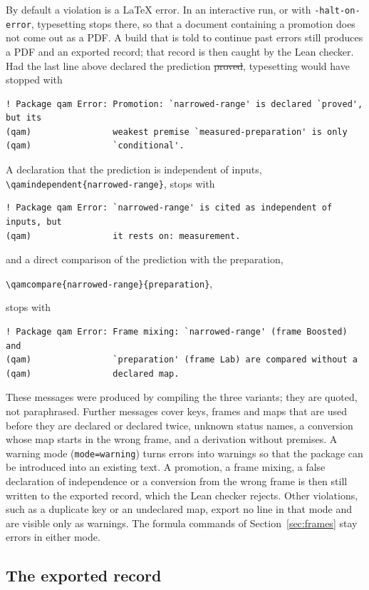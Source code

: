 By default a violation is a \LaTeX{} error. In an interactive run, or with \texttt{-halt-on-error}, typesetting stops there, so that a
document containing a promotion does not come out as a PDF. A build that is told to continue past errors still produces a PDF and an
exported record; that record is then caught by the Lean checker. Had the
last line above declared the prediction \st{proved}, typesetting would have stopped with
\begin{lstlisting}
! Package qam Error: Promotion: `narrowed-range' is declared `proved', but its
(qam)                weakest premise `measured-preparation' is only
(qam)                `conditional'.
\end{lstlisting}
A declaration that the prediction is independent of inputs, \verb|\qamindependent{narrowed-range}|, stops with
\begin{lstlisting}
! Package qam Error: `narrowed-range' is cited as independent of inputs, but
(qam)                it rests on: measurement.
\end{lstlisting}
and a direct comparison of the prediction with the preparation,
\begin{center}\verb|\qamcompare{narrowed-range}{preparation}|,\end{center}
stops with
\begin{lstlisting}
! Package qam Error: Frame mixing: `narrowed-range' (frame Boosted) and
(qam)                `preparation' (frame Lab) are compared without a
(qam)                declared map.
\end{lstlisting}
These messages were produced by compiling the three variants; they are quoted, not paraphrased. Further messages cover keys, frames and
maps that are used before they are declared or declared twice, unknown status names, a conversion whose map starts in the wrong frame,
and a derivation without premises. A warning mode (\texttt{mode=warning}) turns errors into warnings so that the package can be
introduced into an existing text. A promotion, a frame mixing, a false declaration of independence or a conversion from the wrong
frame is then still written to the exported record, which the Lean checker rejects. Other violations, such as a duplicate key or an
undeclared map, export no line in that mode and are visible only as warnings. The formula commands of Section~\ref{sec:frames} stay
errors in either mode.

\subsection{The exported record}

